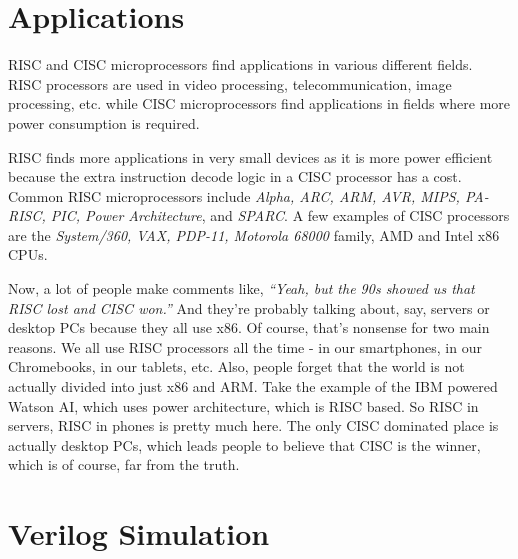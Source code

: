 \documentclass[conference]{IEEEtran}
\begin{document}
\vspace{2mm}
\section{Applications}
RISC and CISC microprocessors find  applications in various different fields.
\\RISC processors are used in video processing, telecommunication, image processing, etc. while CISC microprocessors find applications in fields where more power consumption is required.

RISC finds more applications in very small devices as it is more power efficient because the extra instruction decode logic in a CISC processor has a cost. 
Common RISC microprocessors include \textit{Alpha, ARC, ARM, AVR, MIPS, PA-RISC, PIC, Power Architecture}, and \textit{SPARC}. A few examples of CISC processors are the \textit{System/360, VAX, PDP-11, Motorola 68000} family, AMD and Intel x86 CPUs.

Now, a lot of people make comments like, \textit{“Yeah, but the 90s showed us that RISC lost and CISC won.”} And they’re probably talking about, say, servers or desktop PCs because they all use x86.
Of course, that’s nonsense for two main reasons. We all use RISC processors all the time - in our smartphones, in our Chromebooks, in our tablets, etc. Also, people forget that the world is not actually divided into just x86 and ARM. Take the example of the IBM powered Watson AI, which uses power architecture, which is RISC based. So RISC in servers, RISC in phones is pretty much here. The only CISC dominated place is actually desktop PCs, which leads people to believe that CISC is the winner, which is of course, far from the truth.
\vspace{2mm}
\section{Verilog Simulation}
\end{document}
